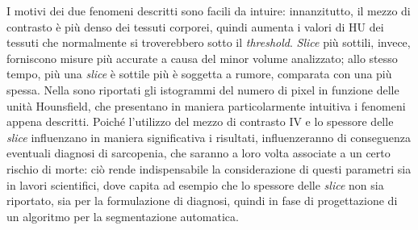 I motivi dei due fenomeni descritti sono facili da intuire: innanzitutto, il mezzo di contrasto è più denso dei tessuti corporei, quindi aumenta i valori di HU dei tessuti che normalmente si troverebbero sotto il \textit{threshold}. \textit{Slice} più sottili, invece, forniscono misure più accurate a causa del minor volume analizzato; allo stesso tempo, più una \textit{slice} è sottile più è soggetta a rumore, comparata con una più spessa. Nella  sono riportati gli istogrammi del numero di pixel in funzione delle unità Hounsfield, che presentano in maniera particolarmente intuitiva i fenomeni appena descritti. Poiché l’utilizzo del mezzo di contrasto IV e lo spessore delle \textit{slice} influenzano in maniera significativa i risultati, influenzeranno di conseguenza eventuali diagnosi di sarcopenia, che saranno a loro volta associate a un certo rischio di morte: ciò rende indispensabile la considerazione di questi parametri sia in lavori scientifici, dove capita ad esempio che lo spessore delle \textit{slice} non sia riportato, sia per la formulazione di diagnosi, quindi in fase di progettazione di un algoritmo per la segmentazione automatica.
